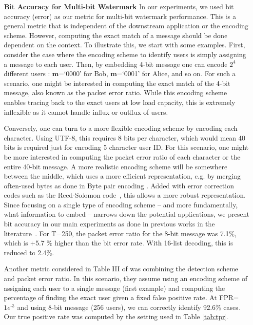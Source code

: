 \noindent\textbf{Bit Accuracy for Multi-bit Watermark}
In our experiments, we used bit accuracy (error) as our metric for multi-bit watermark performance. This is a general metric that is independent of the downstream application or the encoding scheme.
However, computing the exact match of a message should be done dependent on the context.
To illustrate this, we start with some examples. First, consider the case where the encoding scheme to identify users is simply assigning a message to each user. Then, by embedding 4-bit message one can encode $2^{4}$ different users : $\mathbf{m}$=`0000' for Bob, $\mathbf{m}$=`0001' for Alice, and so on. For such a scenario, one might be interested in computing the exact match of the 4-bit message, also known as the packet error ratio.  While this encoding scheme enables tracing back to the exact users at low load capacity, this is extremely inflexible as it cannot handle influx or outflux of users. 


Conversely, one can turn to a more flexible encoding scheme by encoding each character. Using UTF-8, this requires 8 bits per character, which would mean 40 bits is required just for encoding 5 character user ID. For this scenario, one might be more interested in computing the packet error ratio of each character or the entire 40-bit message. A more realistic encoding scheme will be somewhere between the middle, which uses a more efficient representation, e.g. by merging often-used bytes as done in Byte pair encoding \citep{gage1994new}. Added with error correction codes such as the Reed-Solomon code~\citep{wicker1999reed}, this allows a more robust representation. Since focusing on a single type of encoding scheme -- and more fundamentally, what information to embed -- narrows down the potential applications, we present bit accuracy in our main experiments as done in previous works in the literature~\citep{zhu2018hidden, luo2020distortion, yang2022tracing, yoo2023robust, fernandez2023stable}. For T=250, the packet error ratio for the 8-bit message was 7.1\%, which is +5.7 \% higher than the bit error rate. With 16-list decoding, this is reduced to 2.4\%. 


Another metric considered in Table III of \citet{fernandez2023three} was combining the detection scheme and packet error ratio. In this scenario, they assume using an encoding scheme of assigning each user to a single message (first example) and computing the percentage of finding the exact user given a fixed false positive rate. At FPR=$1e^\text{-3}$ and using 8-bit message (256 users), we can correctly identify 92.6\% cases. Our true positive rate was computed by the setting used in Table \ref{tab:tpr}.


